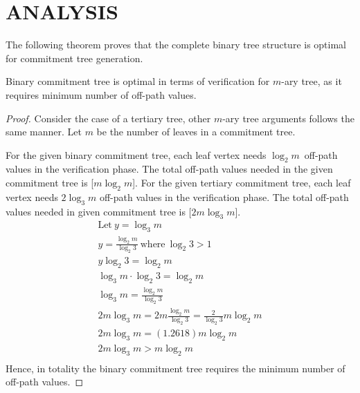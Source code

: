 \chapter{ANALYSIS}

	
	The following theorem proves that the complete binary tree structure is optimal for commitment tree generation.
	\begin{theorem}
		\label{the:ct}
		Binary commitment tree is optimal in terms of verification for $m$-ary tree, as it requires minimum number of off-path values.
	\end{theorem}

	\begin{proof}
		Consider the case of a tertiary tree, other $m$-ary tree arguments follows the same manner.
		Let $m$ be the number of leaves in a commitment tree.
		
		For the given binary commitment tree, each leaf vertex needs $\log_2 m$\ off-path values in the verification phase.
		The total off-path values needed in the given commitment tree is [${m \log_2 m}$].
		For the given tertiary commitment tree, each leaf vertex needs $2 \log_3 m$ off-path values in the verification phase.
		The total off-path values needed in given commitment tree is [$2 m \log_3 m$].
			\begin{equation*}
				\begin{array}{l}
					\mbox{Let}\  y = \log_3 m\\
					y = \frac{ {\log _2 m } }{{\log _2  3 }}\ \mbox{where}\ \log_2 3 > 1\\
					y \log_2 3 = \log _2 m \\
					\log_3 m \cdot \log_2 3 = \log _2 m \\
					\log_3 m = \frac{ {\log _2 m } }{{\log _2  3 }} \\
					2m\log_3 m = 2m\frac{ {\log _2 m } }{{\log _2  3 }} = \frac{ {2 } } {{\log _2  3 }}m\log _2 m \\
					2m\log_3 m = (1.2618)m\log _2 m \\
					2m\log_3 m > m\log _2 m \\

				\end{array}
			\end{equation*}
		Hence, in totality the binary commitment tree requires the minimum number of off-path values.
	\end{proof}

